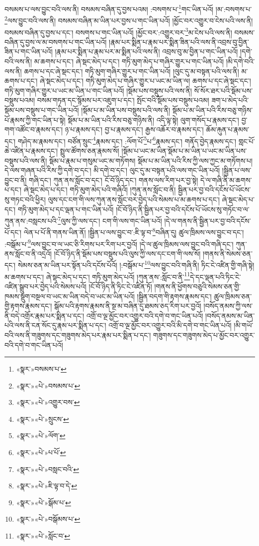 བསམས་པ་ལས་བྱུང་བའི་ལས་ནི། བསམས་བཞིན་དུ་བྱས་པའམ། :བསགས་པ་\footnote{«སྣར་»བསམས་པ་}གང་ཡིན་པའོ། །མ་:བསགས་པ་\footnote{«སྣར་»«པེ་»བསམས་པ་}ལས་བྱུང་བའི་ལས་ནི། བསམས་བཞིན་མ་ཡིན་པར་བྱས་པ་གང་ཡིན་པའོ། །མྱོང་བར་འགྱུར་བ་ངེས་པའི་ལས་ནི། བསམས་བཞིན་དུ་བྱས་པ་དང་། བསགས་པ་གང་ཡིན་པའོ། །མྱོང་བར་:འགྱུར་བར་\footnote{«སྣར་»«པེ་»འགྱུར་བས་}མ་ངེས་པའི་ལས་ནི། བསམས་བཞིན་དུ་བྱས་ལ་མ་བསགས་པ་གང་ཡིན་པའོ། །རྣམ་པར་སྨིན་པ་རྣམ་པར་སྨིན་ཟིན་པའི་ལས་ནི་འབྲས་བུ་བྱིན་ཟིན་པ་གང་ཡིན་པའོ། །རྣམ་པར་སྨིན་པ་རྣམ་པར་མ་སྨིན་པའི་ལས་ནི། འབྲས་བུ་མ་བྱིན་པ་གང་ཡིན་པའོ། །དགེ་བའི་ལས་ནི། མ་ཆགས་པ་དང་། ཞེ་སྡང་མེད་པ་དང་། གཏི་མུག་མེད་པ་གཞིར་གྱུར་པ་གང་ཡིན་པའོ། །མི་དགེ་བའི་ལས་ནི། ཆགས་པ་དང་ཞེ་སྡང་དང་། གཏི་མུག་གཞིར་གྱུར་པ་གང་ཡིན་པའོ། །ལུང་དུ་མ་བསྟན་པའི་ལས་ནི། མ་ཆགས་པ་དང་། ཞེ་སྡང་མེད་པ་དང་། གཏི་མུག་མེད་པ་གཞིར་གྱུར་པ་ཡང་མ་ཡིན་ལ། ཆགས་པ་དང་ཞེ་སྡང་དང་། གཏི་མུག་གཞིར་གྱུར་པ་ཡང་མ་ཡིན་པ་གང་ཡིན་པའོ། །སྡོམ་པས་བསྡུས་པའི་ལས་ནི། སོ་སོར་ཐར་པའི་སྡོམ་པས་བསྡུས་པའམ། བསམ་གཏན་དང་སྙོམས་པར་འཇུག་པ་དང་། སྤོང་བའི་སྡོམ་པས་བསྡུས་པའམ། ཟག་པ་མེད་པའི་སྡོམ་པས་བསྡུས་པ་གང་ཡིན་པའོ། །སྡོམ་པ་མ་ཡིན་པས་བསྡུས་པའི་ལས་ནི། སྡོམ་པ་མ་ཡིན་པའི་རིས་བཅུ་གཉིས་པོ་རྣམས་ཀྱི་གང་ཡིན་པ་སྟེ། སྡོམ་པ་མ་ཡིན་པའི་རིས་བཅུ་གཉིས་ནི། འདི་ལྟ་སྟེ། ལུག་གསོད་པ་རྣམས་དང་། བྱ་གག་འཚོང་བ་རྣམས་དང་། ཉ་པ་རྣམས་དང་། བྱ་པ་རྣམས་དང་། རྒྱས་འཆོར་བ་རྣམས་དང་། ཆོམ་རྐུན་པ་རྣམས་དང་། གཤེད་མ་རྣམས་དང་། བཙོན་སྲུང་\footnote{«སྣར་»«པེ་»སྲུངས་}རྣམས་དང་། :ལོག་པོ་\footnote{«སྣར་»«པེ་»ལོག་}པ་\footnote{«སྣར་»«པེ་»པ་པོ་}རྣམས་དང་། གནོད་བྱེད་རྣམས་དང་། གླང་པོ་ཆེ་འཛིན་པ་རྣམས་དང་། སྤྲུལ་ཚོགས་ཅན་རྣམས་སོ། །སྡོམ་པ་ཡང་མ་ཡིན་སྡོམ་པ་མ་ཡིན་པ་ཡང་མ་ཡིན་པས་བསྡུས་པའི་ལས་ནི། སྡོམ་པ་རྣམ་པ་གསུམ་ཡང་མ་གཏོགས། སྡོམ་པ་མ་ཡིན་པའི་རིས་ཀྱི་ལས་ཀྱང་མ་གཏོགས་པ། དེ་ལས་གཞན་པའི་རིས་ཀྱི་དགེ་བ་དང་། མི་དགེ་བ་དང་། ལུང་དུ་མ་བསྟན་པའི་ལས་གང་ཡིན་པའོ། །སྦྱིན་པ་ལས་བྱུང་བ་ནི། གཞི་དང་། ཀུན་ནས་སློང་བ་དང་། ངོ་བོ་ཉིད་དང་། གནས་ལས་རིག་པར་བྱ་སྟེ། དེ་ལ་གཞི་ནི་མ་ཆགས་པ་དང་། ཞེ་སྡང་མེད་པ་དང་། གཏི་མུག་མེད་པའི་གཞིའོ། །ཀུན་ནས་སློང་བ་ནི། སྦྱིན་པར་བྱ་བའི་དངོས་པོ་ཡོངས་སུ་གཏང་བའི་ཕྱིར། ལུས་དང་ངག་གི་ལས་ཀུན་ནས་སློང་བར་བྱེད་པའི་སེམས་པ་མ་ཆགས་པ་དང་། ཞེ་སྡང་མེད་པ་དང་། གཏི་མུག་མེད་པ་དང་ལྡན་པ་གང་ཡིན་པའོ། །ངོ་བོ་ཉིད་ནི་སྦྱིན་པར་བྱ་བའི་དངོས་པོ་ཡོངས་སུ་གཏོང་བ་ལ་ཀུན་ནས་:བསླངས་པའི་\footnote{«སྣར་»«པེ་»བསླང་བའི་}ལུས་ཀྱི་ལས་དང་། ངག་གི་ལས་གང་ཡིན་པའོ། །དེ་ལ་གནས་ནི་སྦྱིན་པར་བྱ་བའི་དངོས་པོ་དང་། ལེན་པ་པོ་ནི་གནས་ཡིན་ནོ། །སྦྱིན་པ་ལས་བྱུང་བ་:ཇི་ལྟ་བ་\footnote{«སྣར་»«པེ་»ཇི་ལྟ་བ་དེ་}བཞིན་དུ། ཚུལ་ཁྲིམས་ལས་བྱུང་བ་དང་། :བསྒོམ་པ་\footnote{«སྣར་»«པེ་»སྒོམ་པ་}ལས་བྱུང་བ་ལ་ཡང་ཅི་རིགས་པར་རིག་པར་བྱའོ། །དེ་ལ་ཚུལ་ཁྲིམས་ལས་བྱུང་བའི་གཞི་དང་། ཀུན་ནས་སློང་བ་ནི་འདྲའོ། །ངོ་བོ་ཉིད་ནི་སྡོམ་པས་བསྡུས་པའི་ལུས་ཀྱི་ལས་དང་ངག་གི་ལས་སོ། །གནས་ནི་སེམས་ཅན་དང་། སེམས་ཅན་མ་ཡིན་པར་སྟོན་པའི་དངོས་པོའོ། །:བསྒོམ་པ་\footnote{«སྣར་»«པེ་»བསྒོམས་པ་}ལས་བྱུང་བའི་གཞི་ནི། ཏིང་ངེ་འཛིན་གྱི་གཞི་སྟེ། མ་ཆགས་པ་དང་། ཞེ་སྡང་མེད་པ་དང་། གཏི་མུག་མེད་པའོ། །ཀུན་ནས་:སློང་བ་ནི་\footnote{«སྣར་»«པེ་»སློང་བ་}དེ་དང་ལྡན་པའི་ཏིང་ངེ་འཛིན་སྒྲུབ་པར་བྱེད་པའི་སེམས་པའོ། །ངོ་བོ་ཉིད་ནི་ཏིང་ངེ་འཛིན་ཏོ། །གནས་ནི་ཕྱོགས་བཅུའི་སེམས་ཅན་གྱི་ཁམས་སྡུག་བསྔལ་བ་ཡང་མ་ཡིན་བདེ་བ་ཡང་མ་ཡིན་པའོ། །སྦྱིན་བདག་གི་རྟགས་རྣམས་དང་། ཚུལ་ཁྲིམས་ཅན་གྱི་རྟགས་རྣམས་དང་། སྒོམ་པའི་རྟགས་རྣམས་ནི་སྔ་མ་བཞིན་དུ་ཐམས་ཅད་རིག་པར་བྱའོ། །བསོད་ནམས་ཀྱི་ལས་ནི་བདེ་འགྲོར་རྣམ་པར་སྨིན་པ་དང་། འགྲོ་བ་ལྔ་མྱོང་བར་འགྱུར་བའི་དགེ་བ་གང་ཡིན་པའོ། །བསོད་ནམས་མ་ཡིན་པའི་ལས་ནི་ངན་སོང་དུ་རྣམ་པར་སྨིན་པ་དང་། འགྲོ་བ་ལྔ་མྱོང་བར་འགྱུར་བའི་མི་དགེ་བ་གང་ཡིན་པའོ། །མི་གཡོ་བའི་ལས་ནི་གཟུགས་དང་གཟུགས་མེད་པར་རྣམ་པར་སྨིན་པ་དང་། གཟུགས་དང་གཟུགས་མེད་པ་མྱོང་བར་འགྱུར་བའི་དགེ་བ་གང་ཡིན་པའོ། 
